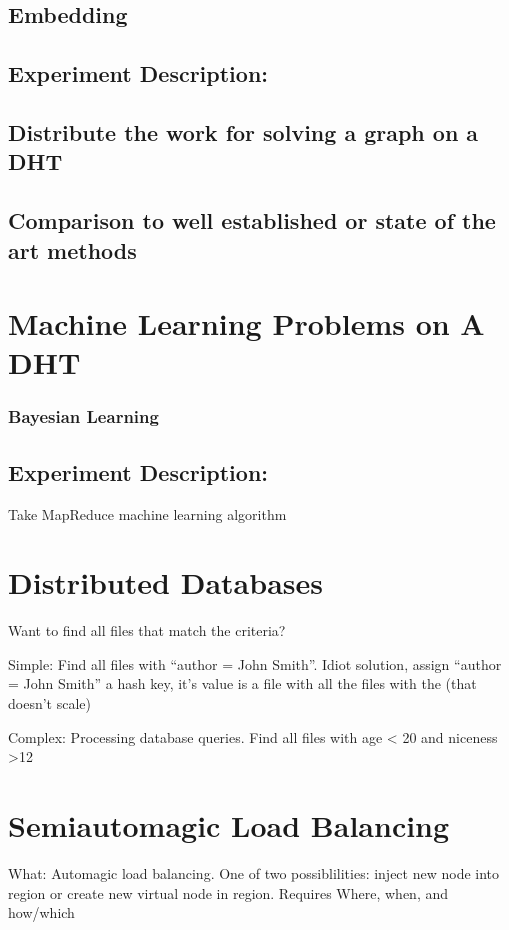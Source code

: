 \documentclass[10pt,letterpaper,twoside]{report}
\begin{document}
\subsection{Embedding}

\subsection{Experiment Description:}
\subsection{Distribute the work for solving a graph on a DHT}
\subsection{Comparison to well established or state of the art methods}



\section{Machine Learning Problems on A DHT}


\subsubsection{Bayesian Learning}
\subsection{Experiment Description:}
Take MapReduce machine learning algorithm

\section{Distributed Databases}


Want to find all files that match the criteria?

Simple: Find all files with ``author = John Smith''.  Idiot solution, assign ``author = John Smith'' a hash key,  it's value is a file with all the files with the (that doesn't scale) 


Complex: Processing database queries.   Find all files with age < 20 and niceness >12


\section{Semiautomagic Load Balancing}
What: Automagic load balancing.  One of two possiblilities:  inject new node into region or create new virtual node in region. 
Requires Where, when, and how/which
\end{document}
